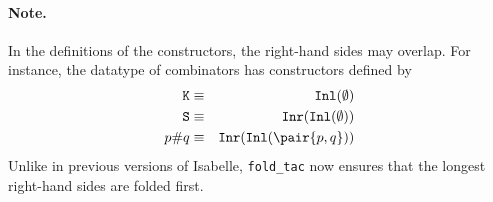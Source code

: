 \paragraph*{Note.}
In the definitions of the constructors, the right-hand sides may overlap.
For instance, the datatype of combinators has constructors defined by
\begin{eqnarray*}
  {\tt K} & \equiv & \Inl(\emptyset) \\
  {\tt S} & \equiv & \Inr(\Inl(\emptyset)) \\
  p{\tt\#}q & \equiv & \Inr(\Inl(\pair{p,q})) 
\end{eqnarray*}
Unlike in previous versions of Isabelle, \verb|fold_tac| now ensures that the
longest right-hand sides are folded first.

\fi

